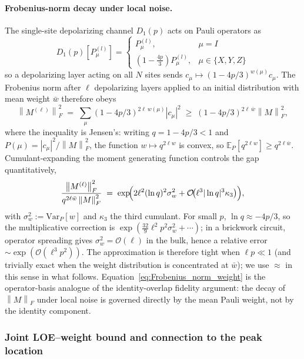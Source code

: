 \documentclass[%
 reprint,
superscriptaddress,
 amsmath,amssymb,
 aps,
]{revtex4-2}
\newcommand{\norm}[1]{\left\lVert#1\right\rVert}
\begin{document}
\paragraph*{Frobenius-norm decay under local noise.} The single-site depolarizing channel $D_1(p)$ acts on Pauli operators as
\begin{equation}
    D_1(p)[P_\mu^{(l)}] = \begin{cases} P_\mu^{(l)},&\mu=I\\ (1-\tfrac{4p}{3})P_\mu^{(l)},&\mu\in\{X,Y,Z\}\end{cases}
\end{equation}
so a depolarizing layer acting on all $N$ sites sends $c_\mu\mapsto (1-4p/3)^{w(\mu)}c_\mu$. The Frobenius norm after $\ell$ depolarizing layers applied to an initial distribution with mean weight $\bar w$ therefore obeys
\begin{equation}
    \norm{M^{(\ell)}}_F^2 \;=\; \sum_\mu (1-4p/3)^{2\ell\,w(\mu)}|c_\mu|^2 \;\ge\; (1-4p/3)^{2\ell\,\bar w}\norm{M}_F^2,
    \label{eq:Frobenius_norm_weight}
\end{equation}
where the inequality is Jensen's: writing $q=1-4p/3<1$ and $P(\mu)=|c_\mu|^2/\norm{M}_F^2$, the function $w\mapsto q^{2\ell w}$ is convex, so $\mathbb{E}_P[q^{2\ell w}]\ge q^{2\ell\bar w}$. Cumulant-expanding the moment generating function controls the gap quantitatively,
\begin{equation}
    \frac{\norm{M^{(\ell)}}_F^2}{q^{2\ell\bar w}\norm{M}_F^2}
    \;=\; \exp\!\Bigl(2\ell^{2}(\ln q)^{2}\sigma_{w}^{2} + \mathcal{O}\!\bigl(\ell^{3}|\ln q|^{3}\kappa_{3}\bigr)\Bigr),
    \label{eq:Frobenius_norm_weight_correction}
\end{equation}
with $\sigma_w^2:=\mathrm{Var}_P[w]$ and $\kappa_3$ the third cumulant. For small $p$, $\ln q\approx-4p/3$, so the multiplicative correction is $\exp(\tfrac{32}{9}\ell^{2}p^{2}\sigma_{w}^{2}+\cdots)$; in a brickwork circuit, operator spreading gives $\sigma_w^2=\mathcal{O}(\ell)$ in the bulk, hence a relative error $\sim\exp(\mathcal{O}(\ell^3 p^2))$. The approximation is therefore tight when $\ell p\ll 1$ (and trivially exact when the weight distribution is concentrated at $\bar w$); we use $\approx$ in this sense in what follows. Equation~\eqref{eq:Frobenius_norm_weight} is the operator-basis analogue of the identity-overlap fidelity argument: the decay of $\norm{M}_F$ under local noise is governed directly by the mean Pauli weight, not by the identity component.

\subsubsection{Joint LOE--weight bound and connection to the peak location}
\end{document}
